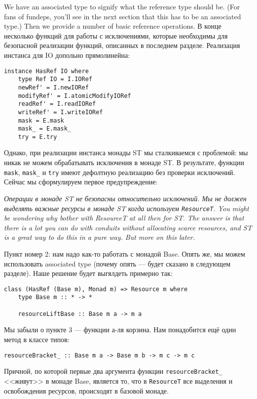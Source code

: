 We have an associated type to signify what the reference type should be. (For fans of
fundeps,
you'll see in the next section that this has to be an associated type.) Then we provide a
number of basic reference operations. В конце несколько функций для работы с
исключениями, которые необходимы для безопасной реализации функций, описанных в
последнем разделе. Реализация инстанса для IO допольно прямолинейна:
  
\begin{lstlisting}
instance HasRef IO where
    type Ref IO = I.IORef
    newRef' = I.newIORef
    modifyRef' = I.atomicModifyIORef
    readRef' = I.readIORef
    writeRef' = I.writeIORef
    mask = E.mask
    mask_ = E.mask_
    try = E.try 
\end{lstlisting}
Однако, при реализации инстанса монады ST мы сталкиваемся с проблемой: мы никак не можем
обрабатывать исключения в монаде ST. В результате, функции \lstinline'mask',
\lstinline'mask_' и \lstinline'try' имеют
дефолтную реализацию без проверки исключений. Сейчас мы сформулируем первое
предупреждение:

\textit{Операции в монаде ST не безопасны относительно исключений. Мы не должен выделять
важные ресурсы в монаде ST когда используем \lstinline'ResourceT'. You might be wondering
why bother
with
ResourceT at all then for ST. The answer is that there is a
lot you can do with conduits without allocating scarce resources, and ST is a
great way to do this in a pure way. But more on this later. }

Пункт номер 2: нам надо как-то работать с монадой Base. Опять же, мы можем
использовать 
associated type (почему опять --- будет сказано в следующем разделе). Наше решение будет
выгялдеть примерно так:
\begin{lstlisting}
class (HasRef (Base m), Monad m) => Resource m where
    type Base m :: * -> *

    resourceLiftBase :: Base m a -> m a 
\end{lstlisting}
Мы забыли о пункте 3 --- функции а-ля корзина. Нам понадобится ещё один метод в классе
типов:
\begin{lstlisting}
resourceBracket_ :: Base m a -> Base m b -> m c -> m c 
\end{lstlisting}
Причной, по которой первые два аргумента функции \lstinline'resourceBracket_' <<живут>> в
монаде Base, является то, что в \lstinline'ResourceT' все выделения и освобождения
ресурсов, происходят в базовой монаде.

